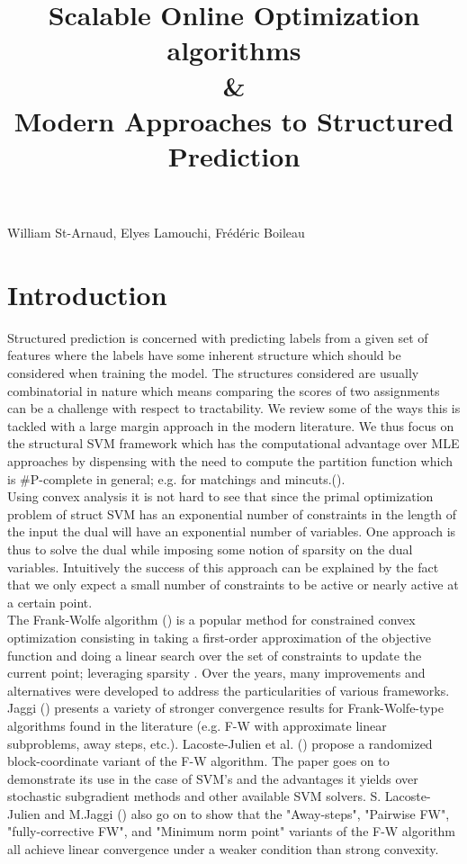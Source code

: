 \documentclass{article}
\title{Scalable Online Optimization algorithms\\ \& \\ Modern Approaches to Structured
Prediction}
\date{}
\begin{document}
 

\maketitle


\vspace{-0.5in}
\begin{center}
William St-Arnaud, Elyes Lamouchi, Fr\'ed\'eric Boileau
\end{center}
\vspace{0.2in}


\section*{Introduction}

Structured prediction is concerned with predicting labels from a given
set of features where the labels have some inherent structure which should
be considered when training the model. The structures considered are usually
combinatorial in nature which means comparing the scores of two assignments
can be a challenge with respect to tractability. We review some of the ways
this is tackled with a large margin approach in the modern literature.
We thus focus on the structural SVM framework which has the computational
advantage over MLE approaches by dispensing with the need to compute the
partition function which is \#P-complete in general; e.g. for
matchings and mincuts.(\cite{dualextraSimon}).\\

Using convex analysis it is not hard to see that since the primal optimization
problem of struct SVM has an exponential number of constraints in the length of
the input the dual will have an exponential number of variables. One approach is
thus to solve the dual while imposing some notion of sparsity on the dual
variables. Intuitively the success of this approach can be explained by the fact
that we only expect a small number of constraints to be active or nearly active
at a certain point. \\

The Frank-Wolfe algorithm (\cite{f-w}) is a popular method for constrained
convex optimization consisting in taking a first-order approximation of the
objective function and doing a linear search over the set of constraints to
update the current point; leveraging sparsity . Over the years, many
improvements and alternatives were developed to address the particularities of
various frameworks. Jaggi (\cite{Jaggi:229246}) presents a variety of stronger
convergence results for Frank-Wolfe-type algorithms found in the literature
(e.g. F-W with approximate linear subproblems, away steps, etc.). Lacoste-Julien
et al. (\cite{dualextraSimon}) propose a randomized block-coordinate variant of
the F-W algorithm. The paper goes on to demonstrate its use in the case of SVM's
and the advantages it yields over stochastic subgradient methods and other
available SVM solvers. S. Lacoste-Julien and M.Jaggi
(\cite{2015arXiv151105932L}) also go on to show that the "Away-steps", "Pairwise
FW", "fully-corrective FW", and "Minimum norm point" variants of the F-W
algorithm all achieve linear convergence under a weaker condition than strong
convexity.\\
\end{document}

